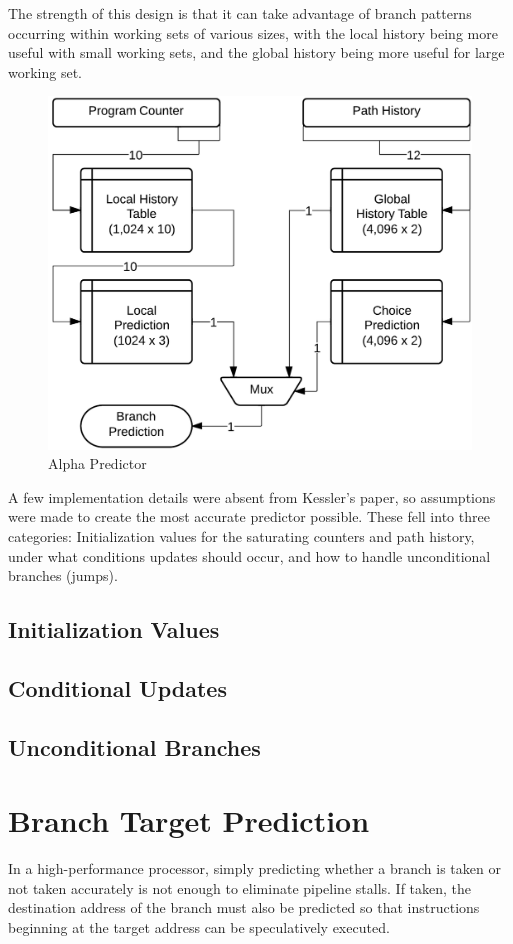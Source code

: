 \documentclass[twocolumn]{article}
\newcommand{\centerimage}[3]{
\begin{figure}[ht!]  
\begin{center} #1
\caption{#2}
\label{#3}
\end{center}
\end{figure}}
\begin{document}
The strength of this design is that it can take advantage of branch patterns occurring within working sets of various sizes, with the local history being more useful with small working sets, and the global history being more useful for large working set.  \centerimage{\includegraphics[width=\columnwidth]{alpha.png}}{Alpha Predictor}{alpha}

A few implementation details were absent from Kessler's paper, so assumptions were made to create the most accurate predictor possible.  These fell into three categories:  Initialization values for the saturating counters and path history, under what conditions updates should occur, and how to handle unconditional branches (jumps).

\subsection{Initialization Values}
\subsection{Conditional Updates}
\subsection{Unconditional Branches}

\section{Branch Target Prediction}
In a high-performance processor, simply predicting whether a branch is taken or not taken accurately is not enough to eliminate pipeline stalls.  If taken, the destination address of the branch must also be predicted so that instructions beginning at the target address can be speculatively executed. 
 
\end{document}
